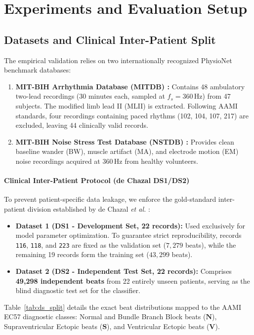 \section{Experiments and Evaluation Setup}
\label{sec:exp}

\subsection{Datasets and Clinical Inter-Patient Split}
\label{sec:data_split}
The empirical validation relies on two internationally recognized PhysioNet benchmark databases:
\begin{enumerate}
    \item \textbf{MIT-BIH Arrhythmia Database (MITDB) \cite{moody2001}:} Contains 48 ambulatory two-lead recordings (30 minutes each, sampled at $f_s = 360$\,Hz) from 47 subjects. The modified limb lead II (MLII) is extracted. Following AAMI standards, four recordings containing paced rhythms (102, 104, 107, 217) are excluded, leaving 44 clinically valid records.
    \item \textbf{MIT-BIH Noise Stress Test Database (NSTDB) \cite{moody1984}:} Provides clean baseline wander (BW), muscle artifact (MA), and electrode motion (EM) noise recordings acquired at 360\,Hz from healthy volunteers.
\end{enumerate}

\paragraph*{Clinical Inter-Patient Protocol (de Chazal DS1/DS2)}
To prevent patient-specific data leakage, we enforce the gold-standard inter-patient division established by de Chazal \emph{et al.} \cite{dechazal2004}:
\begin{itemize}
    \item \textbf{Dataset 1 (DS1 - Development Set, 22 records):} Used exclusively for model parameter optimization. To guarantee strict reproducibility, records \texttt{116}, \texttt{118}, and \texttt{223} are fixed as the validation set ($7{,}279$ beats), while the remaining 19 records form the training set ($43{,}299$ beats).
    \item \textbf{Dataset 2 (DS2 - Independent Test Set, 22 records):} Comprises \textbf{49{,}298 independent beats} from 22 entirely unseen patients, serving as the blind diagnostic test set for the classifier.
\end{itemize}
Table~\ref{tab:ds_split} details the exact beat distributions mapped to the AAMI EC57 diagnostic classes: Normal and Bundle Branch Block beats ($\mathbf{N}$), Supraventricular Ectopic beats ($\mathbf{S}$), and Ventricular Ectopic beats ($\mathbf{V}$).

